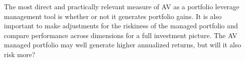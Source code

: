The most direct and practically relevant measure of AV as a portfolio leverage management tool is whether or not it generates portfolio gains. It is also important to make adjustments for the riskiness of the managed portfolio and compare performance across dimensions for a full investment picture. The AV managed portfolio may well generate higher annualized returns, but will it also risk more?

